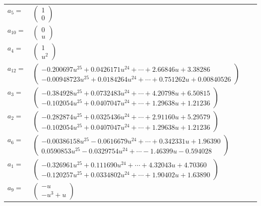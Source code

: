 \documentclass[1p]{elsarticle_modified}
\theoremstyle{definition}
\begin{document}
\begin{tabular}{m{7pt} m{180pt} m{7pt} m{180pt} }
\flushright $a_{5}=$&$\begin{pmatrix}1\\0\end{pmatrix}$ \\
\flushright $a_{10}=$&$\begin{pmatrix}0\\u\end{pmatrix}$ \\
\flushright $a_{4}=$&$\begin{pmatrix}1\\u^2\end{pmatrix}$ \\
\flushright $a_{12}=$&$\begin{pmatrix}-0.200697 u^{25}+0.0426171 u^{24}+\cdots+2.66846 u+3.38286\\-0.00948723 u^{25}+0.0184264 u^{24}+\cdots+0.751262 u+0.00840526\end{pmatrix}$ \\
\flushright $a_{3}=$&$\begin{pmatrix}-0.384928 u^{25}+0.0732483 u^{24}+\cdots+4.20798 u+6.50815\\-0.102054 u^{25}+0.0407047 u^{24}+\cdots+1.29638 u+1.21236\end{pmatrix}$ \\
\flushright $a_{2}=$&$\begin{pmatrix}-0.282874 u^{25}+0.0325436 u^{24}+\cdots+2.91160 u+5.29579\\-0.102054 u^{25}+0.0407047 u^{24}+\cdots+1.29638 u+1.21236\end{pmatrix}$ \\
\flushright $a_{6}=$&$\begin{pmatrix}-0.00386158 u^{25}-0.0616679 u^{24}+\cdots+0.342331 u+1.96390\\0.0590853 u^{25}-0.0329754 u^{24}+\cdots-1.46399 u-0.594028\end{pmatrix}$ \\
\flushright $a_{1}=$&$\begin{pmatrix}-0.326961 u^{25}+0.111690 u^{24}+\cdots+4.32043 u+4.70360\\-0.120257 u^{25}+0.0334802 u^{24}+\cdots+1.90402 u+1.63890\end{pmatrix}$ \\
\flushright $a_{9}=$&$\begin{pmatrix}- u\\- u^3+u\end{pmatrix}$ \\

\end{tabular}
\end{document}
